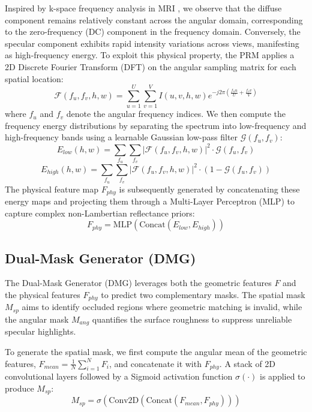 Inspired by k-space frequency analysis in MRI , we observe that the diffuse component remains relatively constant across the angular domain, corresponding to the zero-frequency (DC) component in the frequency domain. Conversely, the specular component exhibits rapid intensity variations across views, manifesting as high-frequency energy. To exploit this physical property, the PRM applies a 2D Discrete Fourier Transform (DFT) on the angular sampling matrix for each spatial location:
\begin{equation}
\label{eq:eq24}
\mathcal{F}(f_u, f_v, h, w) = \sum_{u=1}^{U} \sum_{v=1}^{V} I(u,v,h,w) e^{-j 2\pi \left(\frac{f_u u}{U} + \frac{f_v v}{V}\right)}
\end{equation}
where $f_u$ and $f_v$ denote the angular frequency indices. We then compute the frequency energy distributions by separating the spectrum into low-frequency and high-frequency bands using a learnable Gaussian low-pass filter $\mathcal{G}(f_u, f_v)$:
\begin{equation}
\label{eq:eq25}
E_{low}(h,w) = \sum_{f_u} \sum_{f_v} |\mathcal{F}(f_u, f_v, h, w)|^2 \cdot \mathcal{G}(f_u, f_v)
\end{equation}
\begin{equation}
\label{eq:eq26}
E_{high}(h,w) = \sum_{f_u} \sum_{f_v} |\mathcal{F}(f_u, f_v, h, w)|^2 \cdot (1 - \mathcal{G}(f_u, f_v))
\end{equation}
The physical feature map $F_{phy}$ is subsequently generated by concatenating these energy maps and projecting them through a Multi-Layer Perceptron (MLP) to capture complex non-Lambertian reflectance priors:
\begin{equation}
\label{eq:eq27}
F_{phy} = \text{MLP}(\text{Concat}(E_{low}, E_{high}))
\end{equation}

\subsection{Dual-Mask Generator (DMG)}

The Dual-Mask Generator (DMG) leverages both the geometric features $F$ and the physical features $F_{phy}$ to predict two complementary masks. The spatial mask $M_{sp}$ aims to identify occluded regions where geometric matching is invalid, while the angular mask $M_{ang}$ quantifies the surface roughness to suppress unreliable specular highlights.

To generate the spatial mask, we first compute the angular mean of the geometric features, $F_{mean} = \frac{1}{N}\sum_{i=1}^N F_i$, and concatenate it with $F_{phy}$. A stack of 2D convolutional layers followed by a Sigmoid activation function $\sigma(\cdot)$ is applied to produce $M_{sp}$:
\begin{equation}
\label{eq:eq28}
M_{sp} = \sigma\left(\text{Conv2D}\left(\text{Concat}(F_{mean}, F_{phy})\right)\right)
\end{equation}

